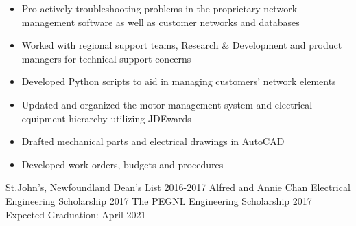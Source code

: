 \documentclass[10pt,a4paper]{altacv}
\begin{document}
\divider

\begin{itemize}
\item Pro-actively troubleshooting problems in the proprietary network management software as well as customer networks and databases 
\item Worked with regional support teams, Research \& Development and product managers for technical support concerns
\item Developed Python scripts to aid in managing customers' network elements
\end{itemize}

\divider

\begin{itemize}
\item Updated and organized the motor management system and electrical equipment hierarchy utilizing JDEwards
\item Drafted mechanical parts and electrical drawings in AutoCAD
\item Developed work orders, budgets and procedures
\end{itemize}

\medskip

 {St.John's, Newfoundland}
Dean’s List 2016-2017 \hspace{0.125cm}%
\linebreak Alfred and Annie Chan Electrical Engineering Scholarship 2017
\linebreak The PEGNL Engineering Scholarship 2017
\linebreak Expected Graduation: April 2021
\end{document}
